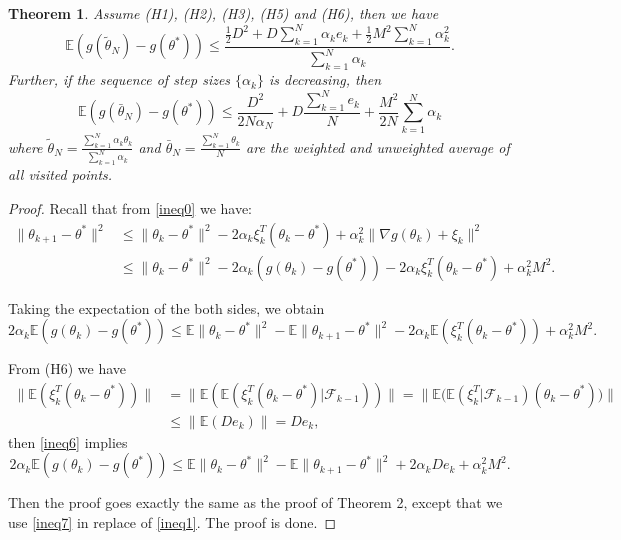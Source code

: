 \documentclass[psamsfonts]{article}
\newtheorem{thm}{Theorem} %
\theoremstyle{definition}
\theoremstyle{remark}
\numberwithin{equation} {section}
\begin{document}
\begin{thm}
Assume (H1), (H2), (H3), (H5) and (H6), then we have
\begin{equation}\label{weighted-avg-expect-bound}
\mathbb E(g(\tilde{\theta}_N) - g(\theta^*)) \le \frac{\frac{1}{2}D^2 + D\sum_{k=1}^N \alpha_k e_k + \frac{1}{2}M^2\sum_{k=1}^N \alpha_k^2}{\sum_{k=1}^N \alpha_k}.
\end{equation}
Further, if the sequence of step sizes $\{\alpha_k\}$ is decreasing, then
\begin{equation}\label{unweighted-avg-expect-bound}
\mathbb E(g(\bar{\theta}_N) - g(\theta^*)) \le \frac{D^2}{2N\alpha_N} + D\frac{\sum_{k=1}^N e_k}{N} + \frac{M^2}{2N}\sum_{k=1}^N \alpha_k
\end{equation}
where $\tilde{\theta}_N = \frac{\sum_{k = 1}^N \alpha_k \theta_k}{\sum_{k = 1}^N \alpha_k}$ and $\bar{\theta}_N = \frac{\sum_{k = 1}^N \theta_k}{N}$ are the weighted and unweighted average of all visited points.
\end{thm}

\begin{proof}
Recall that from \eqref{ineq0} we have:
\begin{equation*}
\begin{aligned}
\|\theta_{k+1} - \theta^*\|^2 &\le \|\theta_k - \theta^*\|^2 -2\alpha_k\xi_k^T(\theta_k - \theta^*) + \alpha_k^2\|\nabla g(\theta_k)+\xi_k\|^2\\
&\le \|\theta_k - \theta^*\|^2 - 2\alpha_k(g(\theta_k)-g(\theta^*)) -2\alpha_k\xi_k^T(\theta_k - \theta^*) + \alpha_k^2M^2.
\end{aligned}
\end{equation*}

Taking the expectation of the both sides, we obtain
\begin{equation}\label{ineq6}
2\alpha_k\mathbb E(g(\theta_k)-g(\theta^*)) \le \mathbb E\|\theta_k - \theta^*\|^2 - \mathbb E\|\theta_{k+1} - \theta^*\|^2 - 2\alpha_k\mathbb E(\xi_k^T(\theta_k - \theta^*)) + \alpha_k^2M^2.
\end{equation}

From (H6) we have
\begin{equation*}
\begin{aligned}
\|\mathbb E(\xi_k^T(\theta_k - \theta^*))\| &= \|\mathbb E(\mathbb E(\xi_k^T(\theta_k - \theta^*)|\mathcal F_{k-1}))\| = \|\mathbb E\big(\mathbb E(\xi_k^T|\mathcal F_{k-1})(\theta_k - \theta^*)\big)\|\\
&\le \| \mathbb E(De_k)  \| = De_k,
\end{aligned}
\end{equation*}
then \eqref{ineq6} implies
\begin{equation}\label{ineq7}
2\alpha_k\mathbb E(g(\theta_k)-g(\theta^*)) \le \mathbb E\|\theta_k - \theta^*\|^2 - \mathbb E\|\theta_{k+1} - \theta^*\|^2 + 2\alpha_kDe_k + \alpha_k^2M^2.
\end{equation}

Then the proof goes exactly the same as the proof of Theorem 2, except that we use \eqref{ineq7} in replace of \eqref{ineq1}. The proof is done.
\end{proof}
\end{document}
